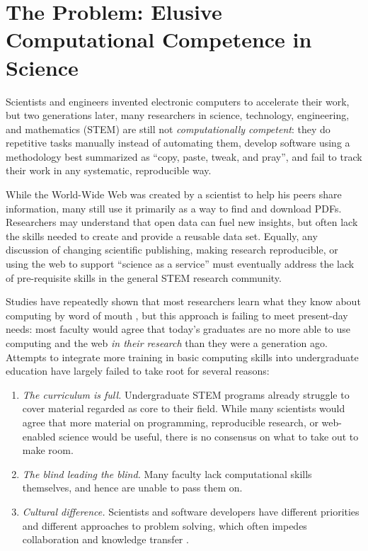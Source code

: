 \documentclass{proposalnsf}
\newlength{\up}
\begin{document}
\section{The Problem: Elusive Computational Competence in Science}

Scientists and engineers invented electronic computers to accelerate
their work, but two generations later, many researchers in science,
technology, engineering, and mathematics (STEM) are still not
\emph{computationally competent}: they do repetitive tasks manually
instead of automating them, develop software using a methodology best
summarized as ``copy, paste, tweak, and pray'', and fail to track
their work in any systematic, reproducible way.

While the World-Wide Web was created by a scientist to help his
peers share information, many still use it primarily as a way to find
and download PDFs.  Researchers may understand that open data can fuel
new insights, but often lack the skills needed to create and provide a
reusable data set.  Equally, any discussion of changing scientific
publishing, making research reproducible, or using the web to support
``science as a service'' must eventually address the lack of
pre-requisite skills in the general STEM research community.

Studies have repeatedly shown that most researchers learn what they
know about computing by word of mouth \cite{hannay2009}, but this
approach is failing to meet present-day needs: most faculty would
agree that today's graduates are no more able to use computing and the
web \emph{in their research} than they were a generation ago.
Attempts to integrate more training in basic computing skills into
undergraduate education have largely failed to take root for several
reasons:

\begin{enumerate}

\item
  \emph{The curriculum is full.}  Undergraduate STEM programs already
  struggle to cover material regarded as core to their field.  While
  many scientists would agree that more material on programming,
  reproducible research, or web-enabled science would be useful, there
  is no consensus on what to take out to make room.

\item
  \emph{The blind leading the blind.}  Many faculty lack computational
  skills themselves, and hence are unable to pass them on.

\item
  \emph{Cultural difference.}  Scientists and software developers have
  different priorities and different approaches to problem solving,
  which often impedes collaboration and knowledge transfer
  \cite{segal2005a}.

\end{enumerate}
\end{document}
